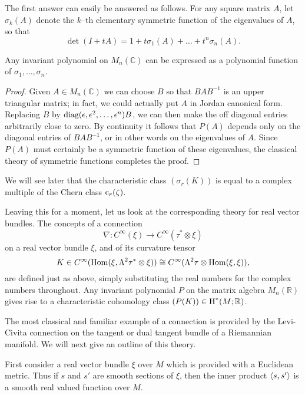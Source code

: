 \documentclass[../main]{subfiles}
\begin{document}
The first answer can easily be answered as follows. For any square matrix $A$, let $\sigma_k(A)$ denote the $k$--th elementary symmetric function of the eigenvalues of $A$, so that \[\det(I + t A) = 1 + t \sigma_1(A) + \ldots + t^n \sigma_n(A).\] 

\begin{lemma}
Any invariant polynomial on $M_n(\mathbb C)$ can be expressed as a polynomial function of $\sigma_1, \ldots, \sigma_n$. 
\end{lemma}

\begin{proof}
Given $A \in M_n(\mathbb C)$ we can choose $B$ so that $BAB^{-1}$ is an upper triangular matrix; in fact, we could actually put $A$ in Jordan canonical form. Replacing $B$ by $\operatorname{diag}(\epsilon, \epsilon^2, \ldots, \epsilon^n)B$, we can then make the off diagonal entries arbitrarily close to zero. By continuity it follows that $P(A)$ depends only on the diagonal entries of $BAB^{-1}$, or in other words on the eigenvalues of $A$. Since $P(A)$ must certainly be a symmetric function of these eigenvalues, the classical theory of symmetric functions completes the proof. 
\end{proof}

We will see later that the characteristic class $(\sigma_r(K))$ is equal to a complex multiple of the Chern class $\operatorname{c}_r(\zeta)$. 

Leaving this for a moment, let us look at the corresponding theory for real vector bundles. The concepts of a connection \[\nabla : C^\infty(\xi) \longrightarrow C^\infty(\tau^\ast \otimes \xi)\] on a real vector bundle $\xi$, and of its curvature tensor \[K \in C^\infty(\operatorname{Hom}(\xi, \Lambda^2 \tau^\ast \otimes \xi)) \cong C^\infty(\Lambda^2 \tau \otimes \operatorname{Hom}(\xi, \xi)),\] are defined just as above, simply substituting the real numbers for the complex numbers throughout. Any invariant polynomial $P$ on the matrix algebra $M_n(\mathbb R)$ gives rise to a characteristic cohomology class $(P(K)) \in \operatorname{H}^\ast(M; \mathbb R)$. 

The most classical and familiar example of a connection is provided by the Levi-Civita connection on the tangent or dual tangent bundle of a Riemannian manifold. We will next give an outline of this theory.

First consider a real vector bundle $\xi$ over $M$ which is provided with a Euclidean metric. Thus if $s$ and $s'$ are smooth sections of $\xi$, then the inner product $\langle s,s'\rangle$ is a smooth real valued function over $M$. 
\end{document}
